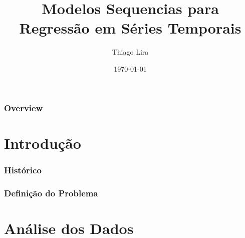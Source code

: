 \documentclass{beamer}
\title{Modelos Sequencias para Regressão em Séries Temporais} %
\author{Thiago Lira} %
\institute[IME-USP] %
{
Instituto de Matemática e Estatística - USP \\ %
\medskip
\textit{thlira15@gmail.com} %
}
\date{\today} %
\begin{document}
\begin{frame}
\titlepage %
\end{frame}

\begin{frame}
\frametitle{Overview} %
\tableofcontents %
\end{frame}


\section{Introdução}


\begin{frame}
\frametitle{Histórico}
\end{frame}



\begin{frame}
\frametitle{Definição do Problema}
\end{frame}


\section{Análise dos Dados}
\end{document}
